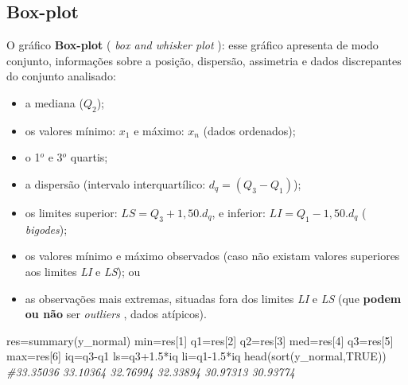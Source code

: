 \documentclass[
]{book}
\newenvironment{Shaded}{\begin{snugshade}}{\end{snugshade}}
\newcommand{\CommentTok}[1]{\textcolor[rgb]{0.56,0.35,0.01}{\textit{#1}}}
\newcommand{\ConstantTok}[1]{\textcolor[rgb]{0.00,0.00,0.00}{#1}}
\newcommand{\DecValTok}[1]{\textcolor[rgb]{0.00,0.00,0.81}{#1}}
\newcommand{\FloatTok}[1]{\textcolor[rgb]{0.00,0.00,0.81}{#1}}
\newcommand{\FunctionTok}[1]{\textcolor[rgb]{0.00,0.00,0.00}{#1}}
\newcommand{\NormalTok}[1]{#1}
\newcommand{\OtherTok}[1]{\textcolor[rgb]{0.56,0.35,0.01}{#1}}
\newcommand{\SpecialCharTok}[1]{\textcolor[rgb]{0.00,0.00,0.00}{#1}}
\providecommand{\tightlist}{%
  \setlength{\itemsep}{0pt}\setlength{\parskip}{0pt}}
\begin{document}
\hypertarget{box-plot}{%
\subsection{Box-plot}\label{box-plot}}

\hfill\break

O gráfico \textbf{Box-plot} ( \emph{box and whisker plot} ): esse gráfico apresenta de modo conjunto, informações sobre a posição, dispersão, assimetria e dados discrepantes do conjunto analisado:

\hfill\break

\begin{itemize}
\tightlist
\item
  a mediana (\(Q_{2}\));
\item
  os valores mínimo: \(x_{1}\) e máximo: \(x_{n}\) (dados ordenados);
\item
  o 1\(^{o}\) e 3\(^{o}\) quartis;
\item
  a dispersão (intervalo interquartílico: \(d_{q}=(Q_{3} - Q_{1})\));
\item
  os limites superior: \(LS=Q_{3} + 1,50.d_{q}\), e inferior: \(LI=Q_{1} - 1,50.d_{q}\) ( \emph{bigodes});
\item
  os valores mínimo e máximo observados (caso não existam valores superiores aos limites \emph{LI} e \emph{LS}); ou
\item
  as observações mais extremas, situadas fora dos limites \emph{LI} e \emph{LS} (que \textbf{podem ou não} ser \emph{outliers} , dados atípicos).
\end{itemize}

\hfill\break

\begin{Shaded}
\begin{Highlighting}[]
\NormalTok{res}\OtherTok{=}\FunctionTok{summary}\NormalTok{(y\_normal)}
\NormalTok{min}\OtherTok{=}\NormalTok{res[}\DecValTok{1}\NormalTok{]}
\NormalTok{q1}\OtherTok{=}\NormalTok{res[}\DecValTok{2}\NormalTok{]}
\NormalTok{q2}\OtherTok{=}\NormalTok{res[}\DecValTok{3}\NormalTok{]}
\NormalTok{med}\OtherTok{=}\NormalTok{res[}\DecValTok{4}\NormalTok{]}
\NormalTok{q3}\OtherTok{=}\NormalTok{res[}\DecValTok{5}\NormalTok{]}
\NormalTok{max}\OtherTok{=}\NormalTok{res[}\DecValTok{6}\NormalTok{]}
\NormalTok{iq}\OtherTok{=}\NormalTok{q3}\SpecialCharTok{{-}}\NormalTok{q1}
\NormalTok{ls}\OtherTok{=}\NormalTok{q3}\FloatTok{+1.5}\SpecialCharTok{*}\NormalTok{iq}
\NormalTok{li}\OtherTok{=}\NormalTok{q1}\FloatTok{{-}1.5}\SpecialCharTok{*}\NormalTok{iq}
\FunctionTok{head}\NormalTok{(}\FunctionTok{sort}\NormalTok{(y\_normal,}\ConstantTok{TRUE}\NormalTok{)) }\CommentTok{\#33.35036 33.10364 32.76994 32.33894 30.97313 30.93774}
\end{Highlighting}
\end{Shaded}
\end{document}
